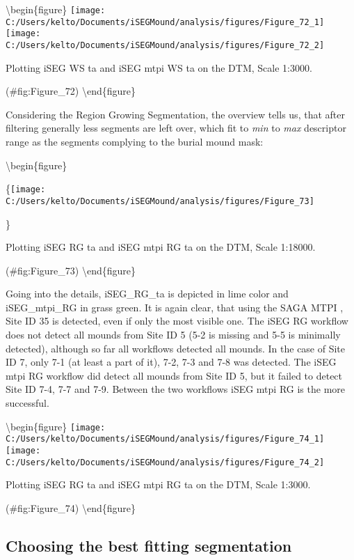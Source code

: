 \documentclass[
]{article}
\begin{document}
\textbackslash begin\{figure\}
\texttt{[image: C:/Users/kelto/Documents/iSEGMound/analysis/figures/Figure\_72\_1]} \texttt{[image: C:/Users/kelto/Documents/iSEGMound/analysis/figures/Figure\_72\_2]}

\caption{Plotting iSEG WS ta and iSEG mtpi WS ta on the DTM, Scale 1:3000.}

(\#fig:Figure\_72)
\textbackslash end\{figure\}

Considering the Region Growing Segmentation, the overview tells us, that after filtering generally less segments are left over, which fit to \emph{min} to \emph{max} descriptor range as the segments complying to the burial mound mask:

\textbackslash begin\{figure\}

\{\centering \texttt{[image: C:/Users/kelto/Documents/iSEGMound/analysis/figures/Figure\_73]}

\}

\caption{Plotting iSEG RG ta and iSEG mtpi RG ta on the DTM, Scale 1:18000.}

(\#fig:Figure\_73)
\textbackslash end\{figure\}

Going into the details, iSEG\_RG\_ta is depicted in lime color and iSEG\_mtpi\_RG in grass green. It is again clear, that using the SAGA MTPI , Site ID 35 is detected, even if only the most visible one.
The iSEG RG workflow does not detect all mounds from Site ID 5 (5-2 is missing and 5-5 is minimally detected), although so far all workflows detected all mounds. In the case of Site ID 7, only 7-1 (at least a part of it), 7-2, 7-3 and 7-8 was detected.
The iSEG mtpi RG workflow did detect all mounds from Site ID 5, but it failed to detect Site ID 7-4, 7-7 and 7-9.
Between the two workflows iSEG mtpi RG is the more successful.

\textbackslash begin\{figure\}
\texttt{[image: C:/Users/kelto/Documents/iSEGMound/analysis/figures/Figure\_74\_1]} \texttt{[image: C:/Users/kelto/Documents/iSEGMound/analysis/figures/Figure\_74\_2]}

\caption{Plotting iSEG RG ta and iSEG mtpi RG ta on the DTM, Scale 1:3000.}

(\#fig:Figure\_74)
\textbackslash end\{figure\}

\newpage

\hypertarget{choosing-the-best-fitting-segmentation}{%
\subsection{\texorpdfstring{\textbf{Choosing the best fitting segmentation}}{Choosing the best fitting segmentation}}\label{choosing-the-best-fitting-segmentation}}
\end{document}
